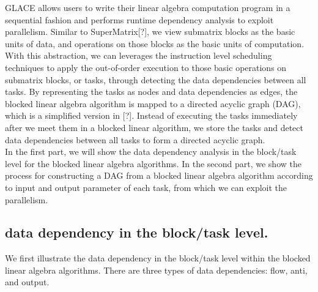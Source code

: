 \documentclass[preprint,11pt]{elsarticle}
\begin{document}
GLACE allows users to write their linear algebra computation program in a sequential fashion and performs runtime dependency analysis to exploit parallelism. Similar to SuperMatrix[?], we view submatrix blocks as the basic units of data, and operations on those blocks  as the basic units of computation. With this abstraction, we can leverages the instruction level scheduling techniques to apply the out-of-order execution to those basic operations on submatrix blocks, or tasks, through detecting the data dependencies between all tasks. By representing the tasks as nodes and data dependencies as edges, the blocked linear algebra algorithm is mapped to a directed acyclic graph (DAG), which is a simplified version in [?]. Instead of executing the tasks immediately after we meet them in a blocked linear algorithm, we store the tasks and detect data dependencies between all tasks to form a directed acyclic graph.\\

In the first part, we will show the data dependency analysis in the block/task level for the blocked linear algebra algorithms. In the second part, we show the process for constructing a DAG from a blocked linear algebra algorithm according to input and output parameter of each task, from which we can exploit the parallelism.\\

\subsection {data dependency in the block/task level.}
We first illustrate the data dependency in the block/task level within the blocked linear algebra algorithms. There are three types of data dependencies: flow, anti, and output.\\
\end{document}
